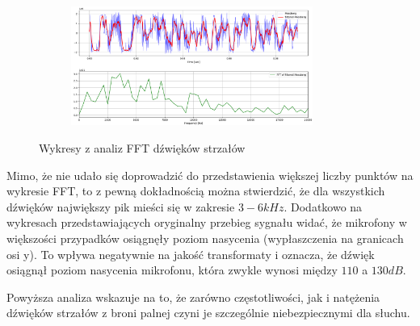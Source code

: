 \begin{figure}[H]
	\begin{subfigure}{.49\textwidth}
		\centering
		\includegraphics[height=3.9cm]{wykresy/Mossberg_fft.png}
	\end{subfigure}
	\caption{\label{pic:wykresy_FFt} Wykresy z analiz FFT dźwięków strzałów}
\end{figure}

Mimo, że nie udało się doprowadzić do przedstawienia większej liczby punktów na wykresie FFT, to z pewną dokładnością można stwierdzić, że dla wszystkich dźwięków największy pik mieści się w zakresie $ 3-6kHz $. Dodatkowo na wykresach przedstawiających oryginalny przebieg sygnału widać, że mikrofony w większości przypadków osiągnęły poziom nasycenia (wypłaszczenia na granicach osi y). To wpływa negatywnie na jakość transformaty i oznacza, że dźwięk osiągnął poziom nasycenia mikrofonu, która zwykle wynosi między $ 110 $ a $ 130 dB $. 

Powyższa analiza wskazuje na to, że zarówno częstotliwości, jak i natężenia dźwięków strzałów z broni palnej czyni je szczególnie niebezpiecznymi dla słuchu.
